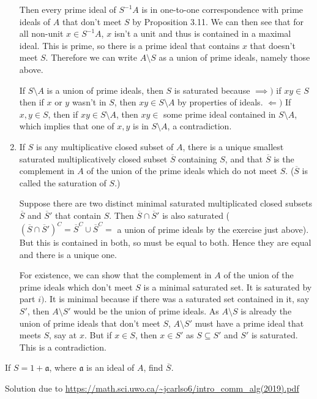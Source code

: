 \documentclass[a4paper]{exam}
\begin{document}
\begin{questions}
\begin{enumerate}
\begin{solution}
		Then every prime ideal of $S^{-1}A $ is in one-to-one correspondence with prime ideals of $A $ that don't meet $S $ by Proposition 3.11.
		We can then see that for all non-unit $x\in S^{-1}A$, $x $ isn't a unit and thus is contained in a maximal ideal.
		This is prime, so there is a prime ideal that contains $x $ that doesn't meet $S $.
		Therefore we can write $A \setminus S $ as a union of prime ideals, namely those above.

		If $S \setminus A $ is a union of prime ideals, then $S $ is saturated because $\implies) $ if $xy\in S $ then if $x $ or $y  $ wasn't in $S $, then $xy \in S \setminus A $ by properties of ideals.
		$\Leftarrow) $ If $x,y \in S $, then if $xy \in S \setminus A$, then $xy \in $ some prime ideal contained in $S \setminus A $, which implies that one of $x,y $ is in $S \setminus A $, a contradiction.
	\end{solution}
	\item If $S$ is any multiplicative closed subset of $A $, there is a unique smallest saturated multiplicatively closed subset $\overline{S}  $ containing $S $, and that $\overline{S}  $ is the complement in $A$ of the union of the prime ideals which do not meet $S$. ($\overline{S}  $ is called the saturation of $S $.) 
	\begin{solution}
		Suppose there are two distinct minimal saturated multiplicated closed subsets $\overline{S}  $ and $\overline{S}'  $ that contain $S $.
		Then $\overline{S}\cap \overline{S}'   $ is also saturated ($(\overline{S}\cap \overline{S}')^C = \overline{S}^C \cup \overline{S}^C =    $ a union of prime ideals by the exercise just above).
		But this is contained in both, so must be equal to both.
		Hence they are equal and there is a unique one.

		For existence, we can show that the complement in $A $ of the union of the prime ideals which don't meet $S $ is a minimal saturated set.
		It is saturated by part $i) $.
		It is minimal because if there was a saturated set contained in it, say $S' $, then $A\setminus S' $ would be the union of prime ideals.
		As $A\setminus S $ is already the union of prime ideals that don't meet $S $, $A \setminus S' $ must have a prime ideal that meets $S $, say at $x $.
		But if $x\in S $, then $x \in S' $ as $S \subseteq S' $ and $S' $ is saturated.
		This is a contradiction.
	\end{solution}
\end{enumerate}
If $S = 1 + \mathfrak{a} $, where $\mathfrak{a} $ is an ideal of $A $, find $\overline{S}  $.
\begin{solution}
	Solution due to \url{https://math.sci.uwo.ca/~jcarlso6/intro_comm_alg(2019).pdf}


\end{solution}
\end{questions}
\end{document}
